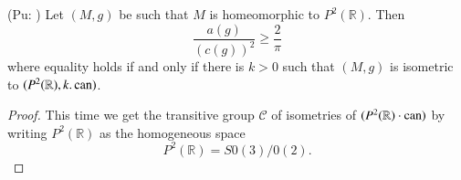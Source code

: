 \begin{coro*}(Pu: \cite{25})
Let $(M,g)$ be such that $M$ is homeomorphic to
$P^{2}(\mathbb{R})$. Then
$$
\frac{a(g)}{(c(g))^{2}}\geq\frac{2}{\pi}
$$
where equality holds if and only if there is $k>0$ such that $(M,g)$
is isometric to $(P^{2}(\mathbb{R}),k.\operatorname{can})$.
\end{coro*}

\begin{proof}
This time we get the transitive group $\mathscr{C}$ of isometries of
$(P^{2}(\mathbb{R})\cdot\operatorname{can})$ by writing $P^{2}(\mathbb{R})$ as the
homogeneous space
$$
P^{2}(\mathbb{R})=S0(3)/0(2).
$$
\end{proof}

\subsection{}\label{chap8:8.12.10}

